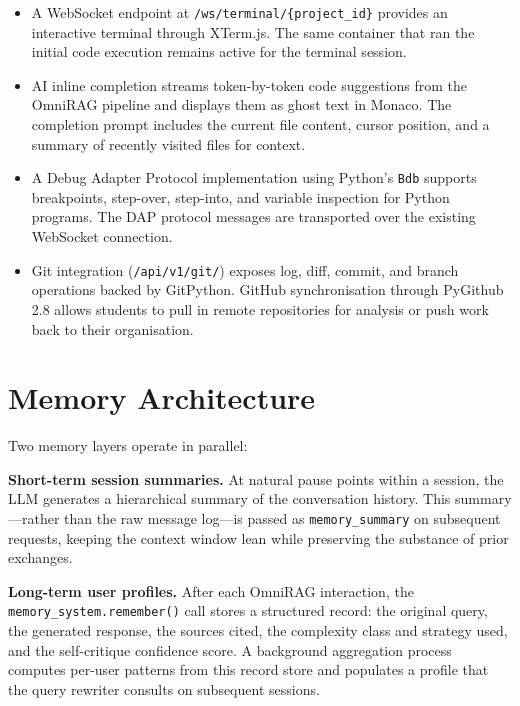 \begin{itemize}
    \item A WebSocket endpoint at \texttt{/ws/terminal/\{project\_id\}} provides
    an interactive terminal through XTerm.js. The same container that ran the
    initial code execution remains active for the terminal session.

    \item AI inline completion streams token-by-token code suggestions from the
    OmniRAG pipeline and displays them as ghost text in Monaco. The completion
    prompt includes the current file content, cursor position, and a summary
    of recently visited files for context.

    \item A Debug Adapter Protocol implementation using Python's \texttt{Bdb}
    supports breakpoints, step-over, step-into, and variable inspection for
    Python programs. The DAP protocol messages are transported over the
    existing WebSocket connection.

    \item Git integration (\texttt{/api/v1/git/}) exposes log, diff, commit,
    and branch operations backed by GitPython. GitHub synchronisation through
    PyGithub 2.8 allows students to pull in remote repositories for analysis
    or push work back to their organisation.
\end{itemize}

\section{Memory Architecture}
\label{sec:memory}

Two memory layers operate in parallel:

\textbf{Short-term session summaries.} At natural pause points within a session,
the LLM generates a hierarchical summary of the conversation history. This
summary---rather than the raw message log---is passed as \texttt{memory\_summary}
on subsequent requests, keeping the context window lean while preserving the
substance of prior exchanges.

\textbf{Long-term user profiles.} After each OmniRAG interaction, the
\texttt{memory\_system.remember()} call stores a structured record: the original
query, the generated response, the sources cited, the complexity class and
strategy used, and the self-critique confidence score. A background aggregation
process computes per-user patterns from this record store and populates a profile
that the query rewriter consults on subsequent sessions.

